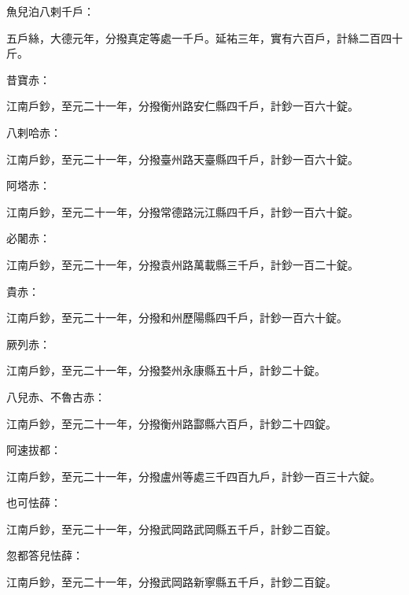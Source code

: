\begin{pinyinscope}
 魚兒泊八剌千戶：



 五戶絲，大德元年，分撥真定等處一千戶。延祐三年，實有六百戶，計絲二百四十斤。



 昔寶赤：



 江南戶鈔，至元二十一年，分撥衡州路安仁縣四千戶，計鈔一百六十錠。



 八剌哈赤：



 江南戶鈔，至元二十一年，分撥臺州路天臺縣四千戶，計鈔一百六十錠。



 阿塔赤：



 江南戶鈔，至元二十一年，分撥常德路沅江縣四千戶，計鈔一百六十錠。



 必闍赤：



 江南戶鈔，至元二十一年，分撥袁州路萬載縣三千戶，計鈔一百二十錠。



 貴赤：



 江南戶鈔，至元二十一年，分撥和州歷陽縣四千戶，計鈔一百六十錠。



 厥列赤：



 江南戶鈔，至元二十一年，分撥婺州永康縣五十戶，計鈔二十錠。



 八兒赤、不魯古赤：



 江南戶鈔，至元二十一年，分撥衡州路酃縣六百戶，計鈔二十四錠。



 阿速拔都：



 江南戶鈔，至元二十一年，分撥盧州等處三千四百九戶，計鈔一百三十六錠。



 也可怯薛：



 江南戶鈔，至元二十一年，分撥武岡路武岡縣五千戶，計鈔二百錠。



 忽都答兒怯薛：



 江南戶鈔，至元二十一年，分撥武岡路新寧縣五千戶，計鈔二百錠。




\end{pinyinscope}
